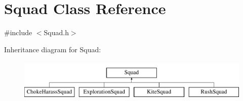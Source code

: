 \hypertarget{class_squad}{\section{Squad Class Reference}
\label{class_squad}
}


{\ttfamily \#include $<$Squad.\-h$>$}

Inheritance diagram for Squad\-:\begin{figure}[H]
\begin{center}
\leavevmode
\includegraphics[height=2.000000cm]{class_squad}
\end{center}
\end{figure}
